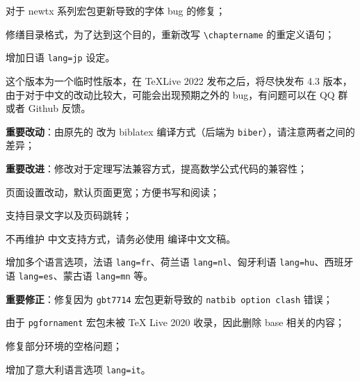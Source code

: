 \documentclass[lang=cn,newtx,10pt,scheme=chinese]{elegantbook}
\begin{document}

\begin{change}
  \item 对于 newtx 系列宏包更新导致的字体 bug 的修复；
  \item 修缮目录格式，为了达到这个目的，重新改写 \lstinline{\chaptername} 的重定义语句；
  \item 增加日语 \lstinline{lang=jp} 设定。
  \item 这个版本为一个临时性版本，在 \TeX Live 2022 发布之后，将尽快发布 4.3 版本，由于对于中文的改动比较大，可能会出现预期之外的 bug，有问题可以在 QQ 群或者 Github 反馈。
\end{change}



\begin{change}
  \item \textbf{重要改动}：由原先的  改为 biblatex 编译方式（后端为 \lstinline{biber}），请注意两者之间的差异；
  \item \textbf{重要改进}：修改对于定理写法兼容方式，提高数学公式代码的兼容性；
  \item 页面设置改动，默认页面更宽；方便书写和阅读；
  \item 支持目录文字以及页码跳转；
  \item 不再维护  中文支持方式，请务必使用  编译中文文稿。
  \item 增加多个语言选项，法语 \lstinline{lang=fr}、荷兰语 \lstinline{lang=nl}、匈牙利语 \lstinline{lang=hu}、西班牙语 \lstinline{lang=es}、蒙古语 \lstinline{lang=mn} 等。
\end{change}



\begin{change}
  \item \textbf{重要修正}：修复因为 \lstinline{gbt7714} 宏包更新导致的 \lstinline{natbib option clash} 错误；
  \item 由于 \lstinline{pgfornament} 宏包未被 \TeX{} Live 2020 收录，因此删除 base 相关的内容；
  \item 修复部分环境的空格问题；
  \item 增加了意大利语言选项 \lstinline{lang=it}。
\end{change}


\end{document}
